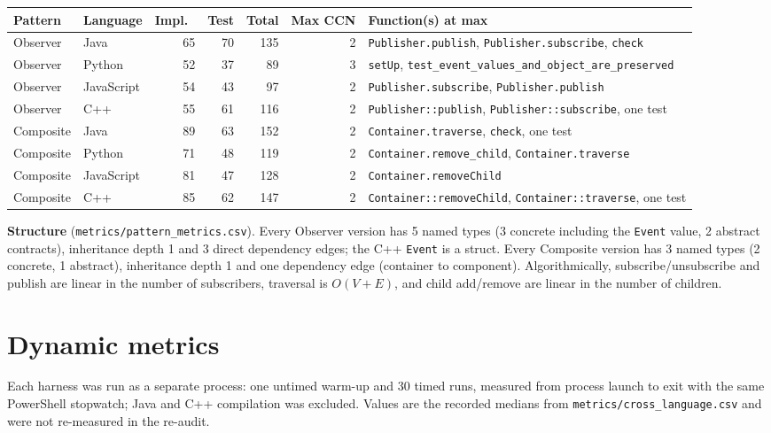 \documentclass[11pt,a4paper]{article}
\newcommand{\code}[1]{\nolinkurl{#1}}
\begin{document}
\begin{tabularx}{\linewidth}{@{}llrrrrY@{}}
\toprule
Pattern & Language & Impl.\ & Test & Total & Max CCN & Function(s) at max\\
\midrule
Observer & Java & 65 & 70 & 135 & 2 & \code{Publisher.publish}, \code{Publisher.subscribe}, \code{check}\\
Observer & Python & 52 & 37 & 89 & 3 & \code{setUp}, \code{test_event_values_and_object_are_preserved}\\
Observer & JavaScript & 54 & 43 & 97 & 2 & \code{Publisher.subscribe}, \code{Publisher.publish}\\
Observer & C++ & 55 & 61 & 116 & 2 & \code{Publisher::publish}, \code{Publisher::subscribe}, one test\\
Composite & Java & 89 & 63 & 152 & 2 & \code{Container.traverse}, \code{check}, one test\\
Composite & Python & 71 & 48 & 119 & 2 & \code{Container.remove_child}, \code{Container.traverse}\\
Composite & JavaScript & 81 & 47 & 128 & 2 & \code{Container.removeChild}\\
Composite & C++ & 85 & 62 & 147 & 2 & \code{Container::removeChild}, \code{Container::traverse}, one test\\
\bottomrule
\end{tabularx}

\textbf{Structure} (\code{metrics/pattern_metrics.csv}). Every Observer version has 5 named types (3 concrete including the \code{Event} value, 2 abstract contracts), inheritance depth 1 and 3 direct dependency edges; the C++ \code{Event} is a struct. Every Composite version has 3 named types (2 concrete, 1 abstract), inheritance depth 1 and one dependency edge (container to component). Algorithmically, subscribe/unsubscribe and publish are linear in the number of subscribers, traversal is $O(V+E)$, and child add/remove are linear in the number of children.

\section{Dynamic metrics}
Each harness was run as a separate process: one untimed warm-up and 30 timed runs, measured from process launch to exit with the same PowerShell stopwatch; Java and C++ compilation was excluded. Values are the recorded medians from \code{metrics/cross_language.csv} and were not re-measured in the re-audit.
\end{document}
